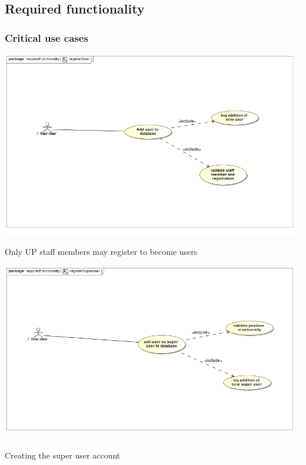 \documentclass[a4paper,12pt]{report}
\begin{document}
\newpage

\subsection{Required functionality}
\subsubsection{Critical use cases}

\begin{flushleft}
	\includegraphics[scale=0.5]{./images/uc__registerUser.jpg}
	\begin{center}
		Only UP staff members may register to become users
	\end{center}

	\includegraphics[scale=0.5]{./images/uc__registerSuperuser.jpg}
	\begin{center}
		Creating the super user account
	\end{center}
\end{flushleft}
\end{document}

